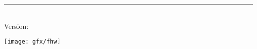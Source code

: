 \begin{titlepage}
	\flushright
	\hfill
	\vfill
	{\LARGE\thesisTitle \par}
	\rule[5pt]{\textwidth}{.4pt} \par
	{\Large\thesisAuthor}
	\vfill
	\textit{\large\thesisDate} \\
	Version: \thesisVersion
\end{titlepage}


\begin{titlepage}
	\tgherosfont
	\centering

	\texttt{[image: gfx/fhw]} \\


\end{titlepage}

